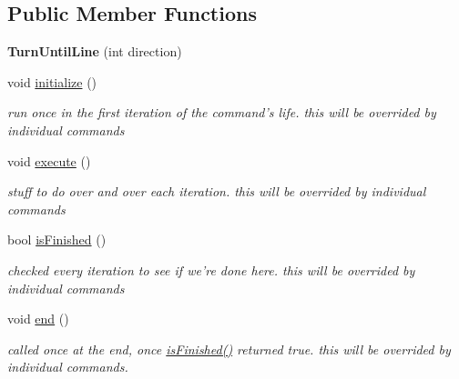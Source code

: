 \subsection*{Public Member Functions}
\begin{DoxyCompactItemize}
\item 
\hypertarget{classTurnUntilLine_a737bfe72e0d4dbcce9f91182e319d28d}{{\bfseries Turn\-Until\-Line} (int direction)}\label{classTurnUntilLine_a737bfe72e0d4dbcce9f91182e319d28d}

\item 
\hypertarget{classTurnUntilLine_a99e42f7512b95097df29633877e72cbd}{void \hyperlink{classTurnUntilLine_a99e42f7512b95097df29633877e72cbd}{initialize} ()}\label{classTurnUntilLine_a99e42f7512b95097df29633877e72cbd}

\begin{DoxyCompactList}\small\item\em run once in the first iteration of the command's life. this will be overrided by individual commands \end{DoxyCompactList}\item 
\hypertarget{classTurnUntilLine_a90feb7840ebc51984e4d0a31383ec5a9}{void \hyperlink{classTurnUntilLine_a90feb7840ebc51984e4d0a31383ec5a9}{execute} ()}\label{classTurnUntilLine_a90feb7840ebc51984e4d0a31383ec5a9}

\begin{DoxyCompactList}\small\item\em stuff to do over and over each iteration. this will be overrided by individual commands \end{DoxyCompactList}\item 
bool \hyperlink{classTurnUntilLine_ad9232508d735c78d6443958fe2f18002}{is\-Finished} ()
\begin{DoxyCompactList}\small\item\em checked every iteration to see if we're done here. this will be overrided by individual commands \end{DoxyCompactList}\item 
\hypertarget{classTurnUntilLine_a769864873e706e0ca6701eac7f947ede}{void \hyperlink{classTurnUntilLine_a769864873e706e0ca6701eac7f947ede}{end} ()}\label{classTurnUntilLine_a769864873e706e0ca6701eac7f947ede}

\begin{DoxyCompactList}\small\item\em called once at the end, once \hyperlink{classTurnUntilLine_ad9232508d735c78d6443958fe2f18002}{is\-Finished()} returned true. this will be overrided by individual commands. \end{DoxyCompactList}\end{DoxyCompactItemize}
